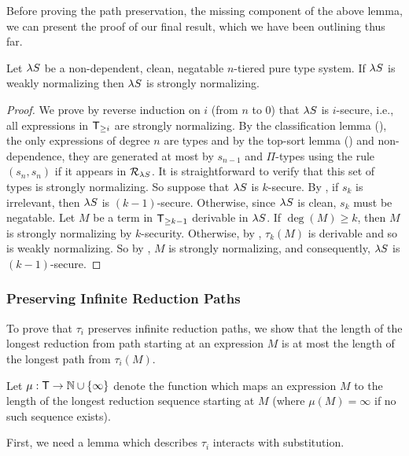 \documentclass{article}
\begin{document}
Before proving the path preservation, the missing component of the above lemma, we can present the proof of our final result, which we have been outlining thus far.

\begin{theorem}
Let $\lambda S$ be a non-dependent, clean, negatable $n$-tiered pure type system.
If $\lambda S$ is weakly normalizing then $\lambda S$ is strongly normalizing.
\end{theorem}

\begin{proof}
We prove by reverse induction on $i$ (from $n$ to $0$) that $\lambda S$ is $i$-secure, i.e., all expressions in $\mathsf{T}_{\geq i}$ are strongly normalizing.
By the classification lemma (), the only expressions of degree $n$ are types and by the top-sort lemma () and non-dependence, they are generated at most by $s_{n - 1}$ and $\Pi$-types using the rule $(s_n, s_n)$ if it appears in $\mathcal R_{\lambda S}$.
It is straightforward to verify that this set of types is strongly normalizing.
So suppose that $\lambda S$ is $k$-secure.
By , if $s_k$ is irrelevant, then $\lambda S$ is $(k - 1)$-secure.
Otherwise, since $\lambda S$ is clean, $s_k$ must be negatable.
Let $M$ be a term in $\mathsf{T}_{\geq k - 1}$ derivable in $\lambda S$.
If $\deg(M) \geq k$, then $M$ is strongly normalizing by $k$-security.
Otherwise, by , $\tau_k(M)$ is derivable and so is weakly normalizing.
So by , $M$ is strongly normalizing, and consequently, $\lambda S$ is $(k - 1)$-secure.
\end{proof}

\subsubsection*{Preserving Infinite Reduction Paths}

To prove that $\tau_i$ preserves infinite reduction paths, we show that the length of the longest reduction from path starting at an expression $M$ is at most the length of the longest path from $\tau_i(M)$.

\begin{definition}
Let $\mu: \mathsf{T} \to \mathbb {N} \cup \{\infty\}$ denote the function which maps an expression $M$ to the length of the longest reduction sequence starting at $M$ (where $\mu(M) = \infty$ if no such sequence exists).
\end{definition}

First, we need a lemma which describes $\tau_i$ interacts with substitution.
\end{document}
